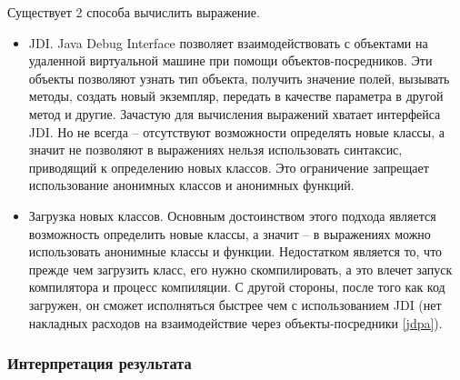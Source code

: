 Существует 2 способа вычислить выражение. 
\begin{itemize}
	\item JDI. Java Debug Interface позволяет взаимодействовать с объектами на удаленной виртуальной машине при помощи объектов-посредников. Эти объекты позволяют узнать тип объекта, получить значение полей, вызывать методы, создать новый экземпляр, передать в качестве параметра в другой метод и другие. Зачастую для вычисления выражений хватает интерфейса JDI. Но не всегда -- отсутствуют возможности определять новые классы, а значит не позволяют в выражениях нельзя использовать синтаксис, приводящий к определению новых классов. Это ограничение запрещает использование анонимных классов и анонимных функций.
	\item Загрузка новых классов. Основным достоинством этого подхода является возможность определить новые классы, а значит -- в выражениях можно использовать анонимные классы и функции. Недостатком является то, что прежде чем загрузить класс, его нужно скомпилировать, а это влечет запуск компилятора и процесс компиляции. С другой стороны, после того как код загружен, он сможет исполняться быстрее чем с использованием JDI (нет накладных расходов на взаимодействие через объекты-посредники \ref{jdpa}).
\end{itemize}

\subsubsection{Интерпретация результата}\label{interpret}

